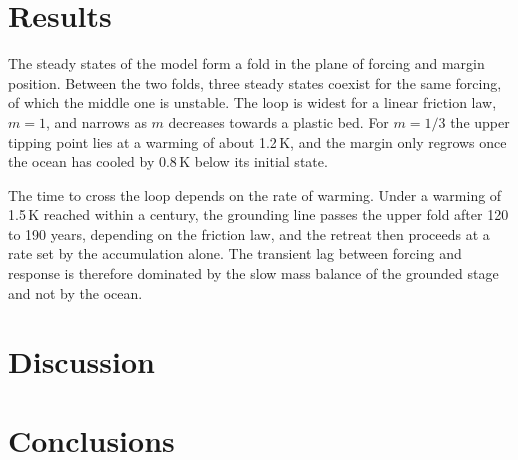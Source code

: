 \documentclass[11pt]{article}
\begin{document}
\section{Results}
The steady states of the model form a fold in the plane of forcing and margin position. Between the two folds, three
steady states coexist for the same forcing, of which the middle one is unstable. The loop is widest for a linear
friction law, $m=1$, and narrows as $m$ decreases towards a plastic bed. For $m=1/3$ the upper tipping point lies at
a warming of about 1.2\,K, and the margin only regrows once the ocean has cooled by 0.8\,K below its initial state.

The time to cross the loop depends on the rate of warming. Under a warming of 1.5\,K reached within a century, the
grounding line passes the upper fold after 120 to 190 years, depending on the friction law, and the retreat then
proceeds at a rate set by the accumulation alone. The transient lag between forcing and response is therefore
dominated by the slow mass balance of the grounded stage and not by the ocean.

\section{Discussion}
\lipsum[1-4]

\section{Conclusions}
\lipsum[5-6]
\end{document}
